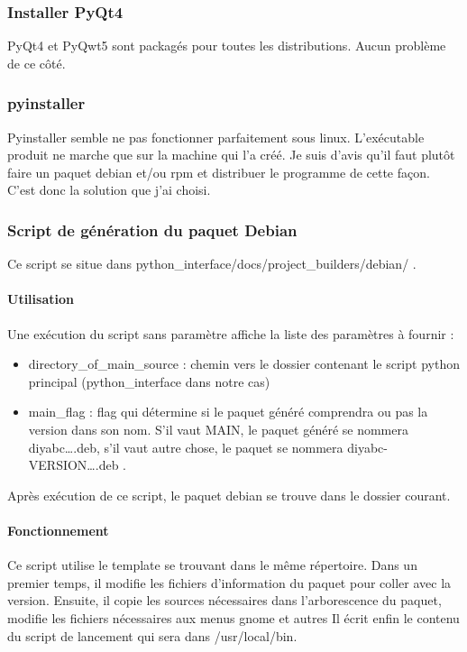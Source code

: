 \documentclass[12pt,a4paper]{article}
\begin{document}
        \subsubsection{Installer PyQt4}

        PyQt4 et PyQwt5 sont packagés pour toutes les distributions. Aucun
        problème de ce côté.
        \subsubsection{pyinstaller}

        Pyinstaller semble ne pas fonctionner parfaitement sous linux.
        L'exécutable produit ne marche que sur la machine qui l'a créé. Je suis
        d'avis qu'il faut plutôt faire un paquet debian et/ou rpm et distribuer
        le programme de cette façon. C'est donc la solution que j'ai choisi.
        \subsubsection{Script de génération du paquet Debian}

        Ce script se situe dans python\_interface/docs/project\_builders/debian/ .
        \paragraph{Utilisation}

        Une exécution du script sans paramètre affiche la liste des paramètres à fournir :\\

        \begin{itemize}
            \item directory\_of\_main\_source : chemin vers le dossier contenant le script python principal (python\_interface dans notre cas)
            \item main\_flag : flag qui détermine si le paquet généré comprendra ou pas la version dans son nom. S'il vaut MAIN, le paquet généré
                se nommera diyabc\ldots.deb, s'il vaut autre chose, le paquet se nommera diyabc-VERSION\ldots.deb .\\
        \end{itemize}

        Après exécution de ce script, le paquet debian se trouve dans le dossier courant.

        \paragraph{Fonctionnement}
        Ce script utilise le template se trouvant dans le même répertoire. Dans
        un premier temps, il modifie les fichiers d'information du paquet pour
        coller avec la version. Ensuite, il copie les sources nécessaires dans
        l'arborescence du paquet, modifie les fichiers nécessaires aux menus
        gnome et autres Il écrit enfin le contenu du script de lancement qui
        sera dans /usr/local/bin.
\end{document}
